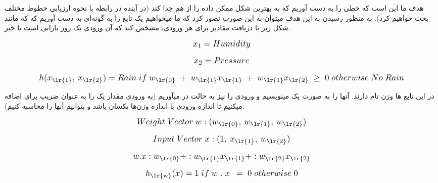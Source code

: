 \documentclass[a4paper, titlepage]{article}
\begin{document}
\clearpage
هدف ما این است که خطی را به دست آوریم که به بهترین شکل ممکن داده را از هم جدا کند (در آینده در رابطه با نحوه ارزیابی خطوط مختلف بحث خواهیم کرد). به منظور رسیدن به این هدف میتوان به این صورت تصور کرد که ما میخواهیم یک تابع  را به گونه‌ای به دست آوریم که که مانند شکل زیر با دریافت مقادیر برای هر ورودی، مشخص کند که آن ورودی یک روز بارانی است یا خیر.

\begin{equation}
    \scalebox{1.2}{${x_{1} = Humidity}$}
    \label{x1Humidity}
\end{equation}

\begin{equation}
    \scalebox{1.2}{${x_{2} = Pressure}$}
    \label{x2Pressure}
\end{equation}

\begin{equation}
    \scalebox{1.2}{${h(x\textsubscript{\lr{1}},\:x\textsubscript{\lr{2}}) = Rain \; if \; w\textsubscript{\lr{0}} \; + \; w\textsubscript{\lr{1}}x\textsubscript{\lr{1}} \; + \; w\textsubscript{\lr{1}}x\textsubscript{\lr{2}} \; \ge \; 0 \; otherwise \; No \; Rain}$} \label{h-function-2}
\end{equation}

در این تابع  ها وزن  نام دارند. آنها را به صورت یک  مینویسیم و ورودی را نیز به حالت  در میآوریم (به  ورودی مقدار یک را به عنوان ضریب برای  اضافه میکنیم تا اندازه  ورودی با اندازه  وزن‌ها یکسان باشد و بتوانیم  آنها را محاسبه کنیم). 

\begin{equation}
    \scalebox{1.2}{${Weight \; Vector \; w : (w\textsubscript{\lr{0}},\:w\textsubscript{\lr{1}},\:w\textsubscript{\lr{2}})}$}
    \label{Weights}
\end{equation}

\begin{equation}
    \scalebox{1.2}{${Input \; Vector \; x : (1,\:x\textsubscript{\lr{1}},\:w\textsubscript{\lr{2}})
    \label{inputs}}$}
\end{equation}

\begin{equation}
    \scalebox{1.2}{${w . x : w\textsubscript{\lr{0}} + :w\textsubscript{\lr{1}}x\textsubscript{\lr{1}}+ :w\textsubscript{\lr{2}}x\textsubscript{\lr{2}}}$}
    \label{wdotx}
\end{equation}

\begin{equation}
    \scalebox{1.2}{${h\textsubscript{\lr{w}}(x) = 1 \; if \; w \; . \; x \; \>= \; 0 \; otherwise \; 0}$}
    \label{h-function-3}
\end{equation}
\end{document}
